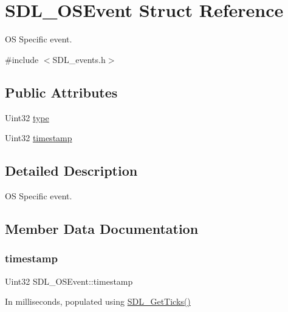\hypertarget{structSDL__OSEvent}{}\section{S\+D\+L\+\_\+\+O\+S\+Event Struct Reference}
\label{structSDL__OSEvent}


OS Specific event.  




{\ttfamily \#include $<$S\+D\+L\+\_\+events.\+h$>$}

\subsection*{Public Attributes}
\begin{DoxyCompactItemize}
\item 
Uint32 \hyperlink{structSDL__OSEvent_a85a600619ebebc8db007fc757b3895a5}{type}
\item 
Uint32 \hyperlink{structSDL__OSEvent_a8b2480eefadad9f3f8c94f8e550b7fb0}{timestamp}
\end{DoxyCompactItemize}


\subsection{Detailed Description}
OS Specific event. 

\subsection{Member Data Documentation}
\mbox{\label{structSDL__OSEvent_a8b2480eefadad9f3f8c94f8e550b7fb0}} 
\subsubsection{\texorpdfstring{timestamp}{timestamp}}
{\footnotesize\ttfamily Uint32 S\+D\+L\+\_\+\+O\+S\+Event\+::timestamp}

In milliseconds, populated using \hyperlink{SDL__timer_8h_a0b9bc71d6287e0ffafdc3419760fe2b3}{S\+D\+L\+\_\+\+Get\+Ticks()} \mbox{\label{structSDL__OSEvent_a85a600619ebebc8db007fc757b3895a5}} 
